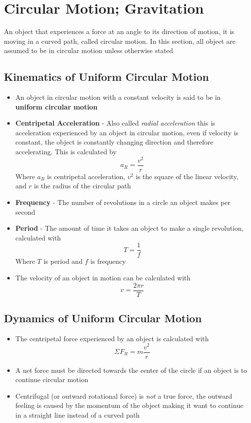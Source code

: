 \section{Circular Motion; Gravitation}
An object that experiences a force at an angle to its direction of motion, it is moving in a curved path, called circular motion. In this section, all object are assumed to be in circular motion unless otherwise stated

\subsection{Kinematics of Uniform Circular Motion}
\begin{itemize}
    \item An object in circular motion with a constant velocity is said to be in \textbf{uniform circular motion}
    \item \textbf{Centripetal Acceleration} - Also called \emph{radial acceleration} this is acceleration experienced by an object in circular motion, even if velocity is constant, the object is constantly changing direction and therefore accelerating. This is calculated by \[a_R=\frac{v^2}{r}\] Where $a_R$ is centripetal acceleration, $v^2$ is the square of the linear velocity, and $r$ is the radius of the circular path
    \item \textbf{Frequency} - The number of revolutions in a circle an object makes per second
    \item \textbf{Period} - The amount of time it takes an object to make a single revolution, calculated with \[T=\frac{1}{f}\] Where $T$ is period and $f$ is frequency
    \item The velocity of an object in motion can be calculated with \[v=\frac{2\pi r}{T}\]
\end{itemize}

\subsection{Dynamics of Uniform Circular Motion}
\begin{itemize}
    \item The centripetal force experienced by an object is calculated with \[\Sigma F_R=m\frac{v^2}{r}\]
    \item A net force must be directed towards the center of the circle if an object is to continue circular motion
    \item Centrifugal (or outward rotational force) is \emph{not} a true force, the outward feeling is caused by the momentum of the object making it want to continue in a straight line instead of a curved path
\end{itemize}

